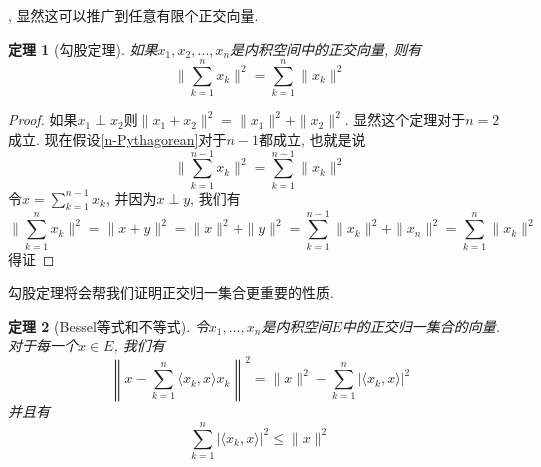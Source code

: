 \documentclass[a4paper,11pt]{book}
\newtheorem{theorem}{\hspace{2em}定理}[section]
\newtheorem{proof}{证明}[section]
\begin{document}
, 显然这可以推广到任意有限个正交向量.
\begin{theorem}[勾股定理]
  如果$x_1,x_2,\dots,x_n$是内积空间中的正交向量, 则有
  \begin{equation*}\label{n-Pythagorean}
    \|\sum_{k=1}^{n}x_k\|^2=\sum_{k=1}^{n}\|x_k\|^2
  \end{equation*}
\end{theorem}
\begin{proof}
  如果$x_1\perp x_2$则$\|x_1+x_2\|^2=\|x_1\|^2+\|x_2\|^2$. 显然这个定理对于$n=2$成立. 现在假设\eqref{n-Pythagorean}对于$n-1$都成立, 也就是说
  \begin{equation*}
    \|\sum_{k=1}^{n-1}x_k\|^2=\sum_{k=1}^{n-1}\|x_k\|^2
  \end{equation*}
  令$x=\sum_{k=1}^{n-1}x_k$, 并因为$x\perp y$, 我们有
  \begin{equation*}
    \|\sum_{k=1}^{n}x_k\|^2=\|x+y\|^2=\|x\|^2+\|y\|^2=\sum_{k=1}^{n-1}\|x_k\|^2+\|x_n\|^2=\sum_{k=1}^{n}\|x_k\|^2
  \end{equation*}
  得证
\end{proof}
勾股定理将会帮我们证明正交归一集合更重要的性质.
\begin{theorem}[Bessel等式和不等式]
  令$x_1,\dots,x_n$是内积空间$E$中的正交归一集合的向量. 对于每一个$x\in E$, 我们有
  \begin{equation}\label{Bessel neq}
    \left\|x-\sum_{k=1}^{n}\langle x_k,x\rangle x_k\right\|^2=\|x\|^2-\sum_{k=1}^{n}|\langle x_k,x\rangle|^2
  \end{equation}
  并且有
  \begin{equation*}
    \sum_{k=1}^{n}|\langle x_k,x\rangle|^2\leq\|x\|^2
  \end{equation*}
\end{theorem}
\end{document}

